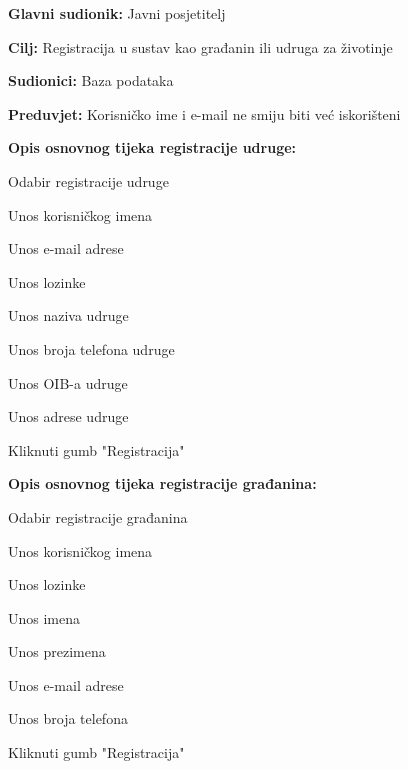 					\noindent {}
					\begin{packed_item}
	
						\item \textbf{Glavni sudionik: } Javni posjetitelj
						\item  \textbf{Cilj:} Registracija u sustav kao građanin ili udruga za životinje
						\item  \textbf{Sudionici:} Baza podataka
						\item  \textbf{Preduvjet:} Korisničko ime i e-mail ne smiju biti već iskorišteni
						\item  \textbf{Opis osnovnog tijeka registracije udruge:}

						\item[] \begin{packed_enum}
							
							\item Odabir registracije udruge
							\item Unos korisničkog imena
							\item Unos e-mail adrese
							\item Unos lozinke
							\item Unos naziva udruge
							\item Unos broja telefona udruge
							\item Unos OIB-a udruge
							\item Unos adrese udruge
							\item Kliknuti gumb "Registracija"
							
							\end{packed_enum}
						
						\item  \textbf{Opis osnovnog tijeka registracije građanina:}
						
						\item[] \begin{packed_enum}
							
							\item Odabir registracije građanina
							\item Unos korisničkog imena
							\item Unos lozinke
							\item Unos imena
							\item Unos prezimena
							\item Unos e-mail adrese
							\item Unos broja telefona
							\item Kliknuti gumb "Registracija"
							

\end{packed_enum}
\end{packed_item}
